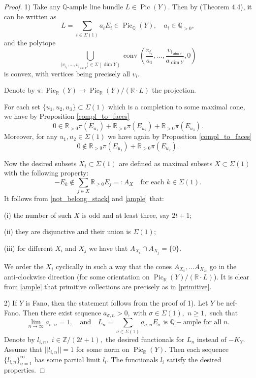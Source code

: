 \documentclass[11pt,leqno]{amsart}
\numberwithin{equation}{section}
\def\R{\mathbb{R}}
\def\Z{\mathbb{Z}}
\def\Q{\mathbb{Q}}
\newcommand{\Pic}{\operatorname{Pic}}
\newcommand{\conv}{\operatorname{conv}}
\begin{document}
\begin{proof} 1) Take any $\Q$-ample line bundle $L\in\Pic(Y).$ Then by \cite{FLTZ} (Theorem 4.4), it can be written
as
$$L=\sum\limits_{i\in\Sigma(1)}a_iE_i\in\Pic_{\Q}(Y),\quad a_i\in\Q_{>0},$$
and the polytope $$\bigcup\limits_{\langle v_{i_1},\dots,v_{i_{\dim Y}}\rangle\in\Sigma(\dim Y)}
\conv(\frac{v_{i_1}}{a_1},\dots,
\frac{v_{i_{\dim Y}}}{a_{\dim Y}},0)$$
is convex, with vertices being precisely all $v_i.$

Denote by $\pi:\Pic_{\R}(Y)\to \Pic_{\R}(Y)/(\R\cdot L)$ the projection.

For each set $\{u_1,u_2,u_3\}\subset\Sigma(1)$
which is a completion to some maximal cone, we have by Proposition \ref{compl_to_faces}
\begin{equation}\label{ample}0\in\R_{>0}\pi(E_{u_1})+\R_{>0}\pi(E_{u_2})+\R_{>0}\pi(E_{u_3}).\end{equation}
Moreover, for any $u_1,u_2\in \Sigma(1)$ we have again by Proposition \ref{compl_to_faces}
\begin{equation}\label{not_belong_stack}0\notin\R_{>0}\pi(E_{u_1})+\R_{>0}\pi(E_{u_2}).\end{equation}

Now the desired subsets $X_i\subset\Sigma(1)$ are defined as maximal subsets $X\subset \Sigma(1)$ with the following property:
$$-E_k\notin\sum\limits_{j\in X}\R_{\geq 0} E_j=:A_X\quad\text{for each }k\in\Sigma(1).$$
It follows from \eqref{not_belong_stack} and \eqref{ample} that:

(i) the number of such $X$ is odd and at least three, say $2t+1;$

(ii) they are disjunctive and their union is $\Sigma(1);$

(iii) for different $X_i$ and $X_j$ we have that
$A_{X_i}\cap A_{X_j}=\{0\}.$

We order the $X_i$ cyclically in such a way that the cones $A_{X_0},\dots A_{X_{2t}}$
go in the anti-clockwise direction (for some orientation on $\Pic_{\R}(Y)/(\R\cdot L)$). It is clear from \eqref{ample} that primitive collections are precisely as
in \eqref{primitive}.

2) If $Y$ is Fano, then the statement follows from the proof of 1).
Let $Y$ be nef-Fano. Then  there exist sequence $a_{\sigma,n}>0,$ with $\sigma\in\Sigma(1),$ $n\geq 1,$ such that
$$\lim\limits_{n\to\infty}a_{\sigma,n}=1,\quad\text{and}\quad L_n=\sum\limits_{\sigma\in\Sigma(1)}a_{\sigma,n}E_{\sigma}\text{ is }\Q-\text{ample for all }n.$$
Denote by $l_{i,n},$ $i\in\Z/(2t+1),$ the desired functionals for $L_n$ instead of $-K_Y.$ Assume that $||l_{i,n}||=1$ for some norm on $\Pic_{\R}(Y).$
Then each sequence $\{l_{i,n}\}_{n=1}^{\infty}$ has some partial limit $l_i.$ The functionals $l_i$ satisfy the desired properties.


\end{proof}
\end{document}
